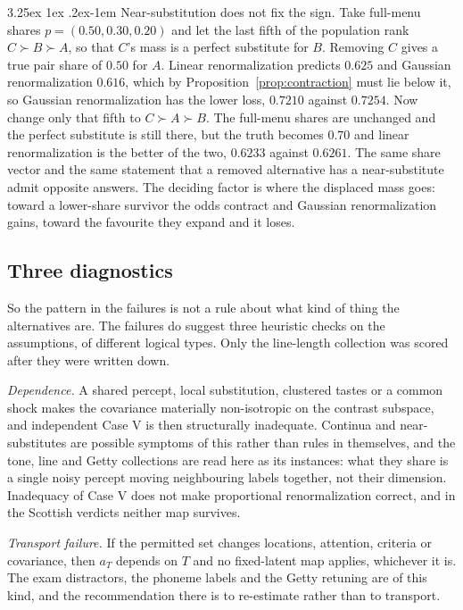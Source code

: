 \documentclass[11pt]{article}
\makeatletter
\theoremstyle{italichead}
\renewcommand\paragraph{\@startsection{paragraph}{4}{\z@}%
  {3.25ex \@plus1ex \@minus.2ex}{-1em}%
  {\normalfont\normalsize\itshape}}
\makeatother
\begin{document}
\paragraph{Near-substitution does not fix the sign.} Take full-menu shares
$p = (0.50, 0.30, 0.20)$ and let the last fifth of the population rank $C \succ B \succ A$, so
that $C$'s mass is a perfect substitute for $B$. Removing $C$ gives a true pair share of $0.50$
for $A$. Linear renormalization predicts $0.625$ and Gaussian renormalization $0.616$, which by
Proposition~\ref{prop:contraction} must lie below it, so Gaussian renormalization has the lower
loss, $0.7210$ against $0.7254$. Now change only that fifth to $C \succ A \succ B$. The full-menu
shares are unchanged and the perfect substitute is still there, but the truth becomes $0.70$ and
linear renormalization is the better of the two, $0.6233$ against $0.6261$. The same share vector
and the same statement that a removed alternative has a near-substitute admit opposite answers.
The deciding factor is where the displaced mass goes: toward a lower-share survivor the odds contract
and Gaussian renormalization gains, toward the favourite they expand and it loses.

\subsection{Three diagnostics}
\label{sec:diagnostics}

So the pattern in the failures is not a rule about what kind of thing the alternatives are.
The failures do suggest three heuristic checks on the assumptions, of different logical types.
Only the line-length collection was scored after they were written down.

\emph{Dependence.} A shared percept, local substitution, clustered tastes or a common shock makes
the covariance materially non-isotropic on the contrast subspace, and independent Case V is then
structurally inadequate. Continua and near-substitutes are possible symptoms of this rather than
rules in themselves, and the tone, line and Getty collections are read here as its instances: what
they share is a single noisy percept moving neighbouring labels together, not their dimension.
Inadequacy of Case V does not make proportional renormalization correct, and in the Scottish
verdicts neither map survives.

\emph{Transport failure.} If the permitted set changes locations, attention, criteria or
covariance, then $a_T$ depends on $T$ and no fixed-latent map applies, whichever it is. The exam
distractors, the phoneme labels and the Getty retuning are of this kind, and the recommendation
there is to re-estimate rather than to transport.
\end{document}
